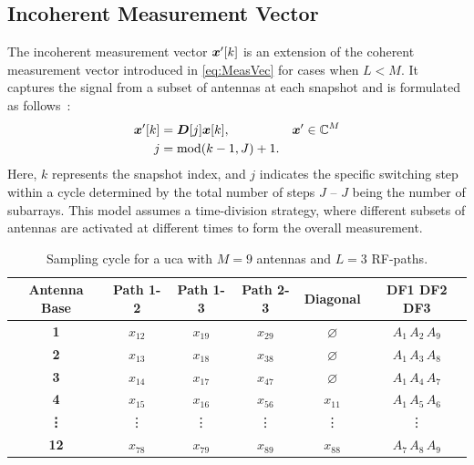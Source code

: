 \subsection{Incoherent Measurement Vector}
\label{subsec:IncoherentMeasurementVector}
The incoherent measurement vector \( \boldsymbol{x}'[k] \) is an extension of the coherent measurement vector introduced
in \autoref{eq:MeasVec} for cases when \( L < M \). It captures the signal from a subset of antennas at each snapshot
and is formulated as follows~\cite[Chapter 6]{meyer}:
\begin{align}
    \boldsymbol{x}'[k] &= \boldsymbol{D}[j] \boldsymbol{x}[k], & \boldsymbol{x}' \in \mathbb{C}^{M} \\
    j &= \text{mod}(k-1, J) + 1.
\end{align}
Here, \( k \) represents the snapshot index, and \( j \) indicates the specific switching step within a cycle determined
by the total number of steps \( J \) -- \( J \) being the number of subarrays. This model assumes a time-division strategy, where different subsets of antennas
are activated at different times to form the overall measurement.%

\begin{table}[H]
    \caption{Sampling cycle for a \gls{uca} with \( M = 9 \) antennas and \( L = 3 \) RF-paths.}
    \label{tab:SamplingCycle}
    \centering
    \begin{tabular}{>{\bfseries}c*{5}{c}}
      \toprule
      Antenna Base & Path 1-2 & Path 1-3 & Path 2-3 & Diagonal & DF1 DF2 DF3 \\
      \midrule
      1 & \(x_{12}\) & \(x_{19}\) & \(x_{29}\) & \(\varnothing\) & \(A_{1}\, A_{2}\, A_{9}\) \\
      2 & \(x_{13}\) & \(x_{18}\) & \(x_{38}\) & \(\varnothing\) & \(A_{1}\, A_{3}\, A_{8}\) \\
      3 & \(x_{14}\) & \(x_{17}\) & \(x_{47}\) & \(\varnothing\) & \(A_{1}\, A_{4}\, A_{7}\) \\
      4 & \(x_{15}\) & \(x_{16}\) & \(x_{56}\) & \(x_{11}\) & \(A_{1}\, A_{5}\, A_{6}\)  \\
      \vdots & \vdots & \vdots & \vdots & \vdots & \vdots \\
      12 & \(x_{78}\) & \(x_{79}\) & \(x_{89}\) & \(x_{88}\) & \(A_{7}\, A_{8}\, A_{9}\) \\
      \bottomrule
    \end{tabular}
  \end{table}


